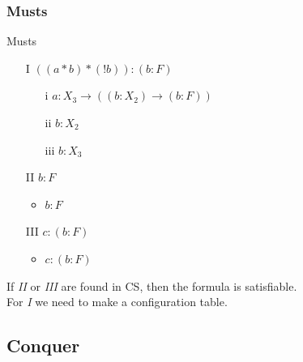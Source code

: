 \documentclass{beamer}
\begin{document}
\subsubsection{Musts}
\begin{frame}{Musts}
	\begin{itemize}
	\item[I]$((a*b)*(!b)):(b:F)$
		\begin{itemize}
		\item[i] $a:X_3 \to ((b:X_2) \rightarrow (b:F))$
		\item[ii] $b:X_2$
		\item[iii] $b:X_3$
		\end{itemize}
	\item[II]$b:F$
		\begin{itemize}
		\item $b:F$
		\end{itemize}
	\item[III]$c:(b:F)$
		\begin{itemize}
		\item $c:(b:F)$
		\end{itemize}
	\vspace{1cm}
	\end{itemize}
	If \emph{II} or \emph{III} are found in CS, then the formula is satisfiable.\\
	For \emph{I} we need to make a configuration table.
\end{frame}

\subsection{Conquer}
\end{document}
